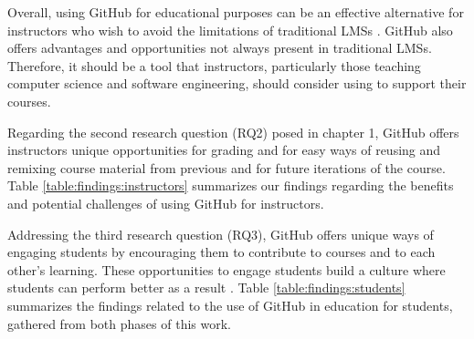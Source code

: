 Overall, using GitHub for educational purposes can be an effective alternative for instructors who wish to avoid the limitations of traditional LMSs \cite{garcia2011opening}. GitHub also offers advantages and opportunities not always present in traditional LMSs. Therefore, it should be a tool that instructors, particularly those teaching computer science and software engineering, should consider using to support their courses.

Regarding the second research question (RQ2) posed in chapter 1, GitHub offers instructors unique opportunities for grading and for easy ways of reusing and remixing course material from previous and for future iterations of the course. Table \ref{table:findings:instructors} summarizes our findings regarding the benefits and potential challenges of using GitHub for instructors.

Addressing the third research question (RQ3), GitHub offers unique ways of engaging students by encouraging them to contribute to courses and to each other's learning. These opportunities to engage students build a culture where students can perform better as a result \cite{kuh2001assessing}. Table \ref{table:findings:students} summarizes the findings related to the use of GitHub in education for students, gathered from both phases of this work.

